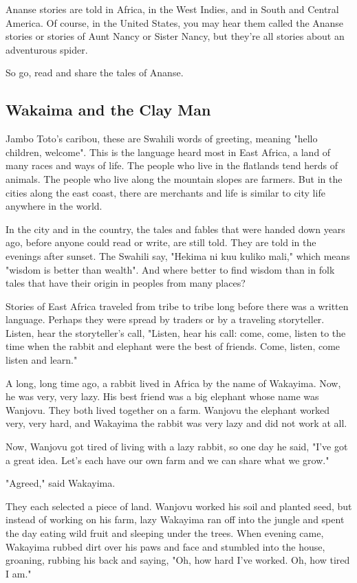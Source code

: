 Ananse stories are told in Africa, in the West Indies, and in South and Central America. Of course, in the United States, you may hear them called the Ananse stories or stories of Aunt Nancy or Sister Nancy, but they're all stories about an adventurous spider.

So go, read and share the tales of Ananse.

\subsection{Wakaima and the Clay Man}

Jambo Toto's caribou, these are Swahili words of greeting, meaning "hello children, welcome". This is the language heard most in East Africa, a land of many races and ways of life. The people who live in the flatlands tend herds of animals. The people who live along the mountain slopes are farmers. But in the cities along the east coast, there are merchants and life is similar to city life anywhere in the world.

In the city and in the country, the tales and fables that were handed down years ago, before anyone could read or write, are still told. They are told in the evenings after sunset. The Swahili say, "Hekima ni kuu kuliko mali," which means "wisdom is better than wealth". And where better to find wisdom than in folk tales that have their origin in peoples from many places?

Stories of East Africa traveled from tribe to tribe long before there was a written language. Perhaps they were spread by traders or by a traveling storyteller. Listen, hear the storyteller's call, "Listen, hear his call: come, come, listen to the time when the rabbit and elephant were the best of friends. Come, listen, come listen and learn."

A long, long time ago, a rabbit lived in Africa by the name of Wakayima. Now, he was very, very lazy. His best friend was a big elephant whose name was Wanjovu. They both lived together on a farm. Wanjovu the elephant worked very, very hard, and Wakayima the rabbit was very lazy and did not work at all.

Now, Wanjovu got tired of living with a lazy rabbit, so one day he said, "I've got a great idea. Let's each have our own farm and we can share what we grow."

"Agreed," said Wakayima.

They each selected a piece of land. Wanjovu worked his soil and planted seed, but instead of working on his farm, lazy Wakayima ran off into the jungle and spent the day eating wild fruit and sleeping under the trees. When evening came, Wakayima rubbed dirt over his paws and face and stumbled into the house, groaning, rubbing his back and saying, "Oh, how hard I've worked. Oh, how tired I am."

